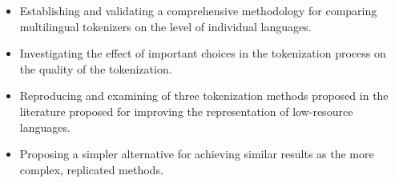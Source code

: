 \begin{itemize}
    \item Establishing and validating a comprehensive methodology for comparing multilingual tokenizers on the level of individual languages.
    \item Investigating the effect of important choices in the tokenization process on the quality of the tokenization.
    \item Reproducing and examining of three tokenization methods proposed in the literature proposed for improving the representation of low-resource languages.
    \item Proposing a simpler alternative for achieving similar results as the more complex, replicated methods.
\end{itemize}






